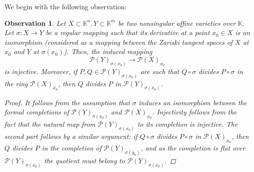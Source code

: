\documentclass{amsart}
\theoremstyle{plain}
\newtheorem{obs}[thm]{Observation}
\theoremstyle{definition}
\theoremstyle{remark}
\numberwithin{equation}{section}
\newcommand{\K}{\mathbb{K}}
\newcommand{\PP}{\mathcal{P}}
\begin{document}
We begin with the following observation:
\begin{obs}\label{obs_flat}
Let $X\subset \K^n, Y\subset \K^m$ be two nonsingular affine varieties over $\K$. Let $\sigma:X\rightarrow Y$ be a regular mapping such that its derivative at a point $x_0\in X$ is an isomorphism (considered as a mapping between the Zariski tangent spaces of $X$ at $x_0$ and $Y$ at $\sigma(x_0)$). Then, the induced mapping 
\begin{equation*}
    \PP(Y)_{\sigma(x_0)}\rightarrow\PP(X)_{x_0}
\end{equation*}
is injective. Moreover, if $P,Q\in\PP(Y)_{\sigma(x_0)}$ are such that $Q\circ \sigma$ divides $P\circ \sigma$ in the ring $\PP(X)_{x_0}$, then $Q$ divides $P$ in $\PP(Y)_{\sigma(x_0)}$.
\begin{proof}
It follows from the assumption  that $\sigma$ induces an isomorphism between the formal completions of $\PP(Y)_{\sigma(x_0)}$ and $\PP(X)_{x_0}$. Injectivity follows from the fact that the natural map from $\PP(Y)_{\sigma(x_0)}$ to its completion is injective. The second part follows by a similar argument; if $Q\circ \sigma$ divides $P\circ \sigma$ in $\PP(X)_{x_0}$, then $Q$ divides $P$ in the completion of $\PP(Y)_{\sigma(y_0)}$, and as the completion is flat over $\PP(Y)_{\sigma(x_0)}$ the quotient must belong to $\PP(Y)_{\sigma(x_0)}$.
\end{proof}
\end{obs}
\end{document}
